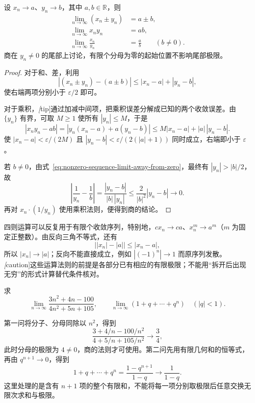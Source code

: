 \documentclass[UTF8,12pt,a4paper,fontset=fandol]{ctexbook}
\begin{document}
\begin{theorem}[极限的四则运算]
\label{thm:sequence-limit-arithmetic}
设 $x_n\to a$、$y_n\to b$，其中 $a,b\in\mathbb{R}$，则
\begin{equation}
    \begin{aligned}
        \lim_{n\to\infty}(x_n\pm y_n)&=a\pm b,\\
        \lim_{n\to\infty}x_ny_n&=ab,\\
        \lim_{n\to\infty}\frac{x_n}{y_n}&=\frac ab\qquad(b\neq0).
    \end{aligned}
    \label{eq:sequence-limit-arithmetic}
\end{equation}
商在 $y_n\neq0$ 的尾部上讨论，有限个分母为零的起始位置不影响尾部极限。
\end{theorem}

\begin{proof}
对于和、差，利用
\[
    |(x_n\pm y_n)-(a\pm b)|\leq|x_n-a|+|y_n-b|,
\]
使右端两项分别小于 $\varepsilon/2$ 即可。

对于乘积，\emph[tip]{通过加减中间项，把乘积误差分解成已知的两个收敛误差。}由 $\{y_n\}$ 有界，可取 $M\geq1$ 使所有 $|y_n|\leq M$，于是
\[
    |x_ny_n-ab|
    =|y_n(x_n-a)+a(y_n-b)|
    \leq M|x_n-a|+|a|\,|y_n-b|.
\]
使 $|x_n-a|<\varepsilon/(2M)$ 且 $|y_n-b|<\varepsilon/(2(|a|+1))$ 同时成立，右端即小于 $\varepsilon$。

若 $b\neq0$，由式~\eqref{eq:nonzero-sequence-limit-away-from-zero}，最终有 $|y_n|>|b|/2$，故
\[
    \left|\frac1{y_n}-\frac1b\right|
    =\frac{|y_n-b|}{|b|\,|y_n|}
    \leq\frac2{|b|^2}|y_n-b|\to0.
\]
再对 $x_n\cdot(1/y_n)$ 使用乘积法则，便得到商的结论。
\end{proof}

四则运算可以反复用于有限个收敛序列，特别地，$c x_n\to ca$、$x_n^m\to a^m$（$m$ 为固定正整数）。由反向三角不等式，还有
\[
    \bigl||x_n|-|a|\bigr|\leq|x_n-a|,
\]
所以 $|x_n|\to|a|$；反向不能直接成立，例如 $|(-1)^n|\to1$ 而原序列发散。\emph[caution]{这些运算法则的前提是各部分已有相应的有限极限；不能用“拆开后出现无穷”的形式计算替代条件核对。}

\begin{example}
\label{ex:sequence-limit-arithmetic-applications}
求
\[
    \lim_{n\to\infty}\frac{3n^2+4n-100}{4n^2+5n+105},
    \qquad
    \lim_{n\to\infty}(1+q+\cdots+q^n)\quad(|q|<1).
\]
\end{example}

\begin{solve}
第一问将分子、分母同除以 $n^2$，得到
\[
    \frac{3+4/n-100/n^2}{4+5/n+105/n^2}\to\frac34,
\]
此时分母的极限为 $4\neq0$，商的法则才可使用。第二问先用有限几何和的恒等式，再由 $q^{n+1}\to0$，得到
\[
    1+q+\cdots+q^n=\frac{1-q^{n+1}}{1-q}\to\frac1{1-q}.
\]
这里处理的是含有 $n+1$ 项的整个有限和，不能将每一项分别取极限后任意交换无限次求和与极限。
\end{solve}
\end{document}
